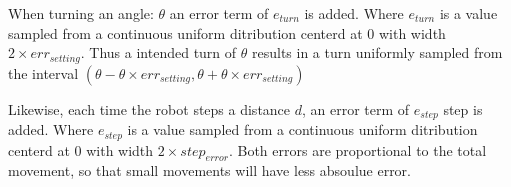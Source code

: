 When turning an angle: $\theta$ an error term of $e_{turn}$ is added. Where $e_{turn}$ is a value sampled from a continuous uniform ditribution centerd at $0$ with width $2\times err_{setting}$. 
Thus a intended turn of $\theta$ results in a turn uniformly sampled from the interval $(\theta - \theta \times err_{setting}, \theta + \theta \times err_{setting})$


Likewise, each time the robot steps a distance $d$, an error term of $e_{step}$ step is added.
Where $e_{step}$ is a value sampled from a continuous uniform ditribution centerd at 0 with width $2\times step_{error}$. 
Both errors are proportional to the total movement, so that small movements will have less absoulue error.

